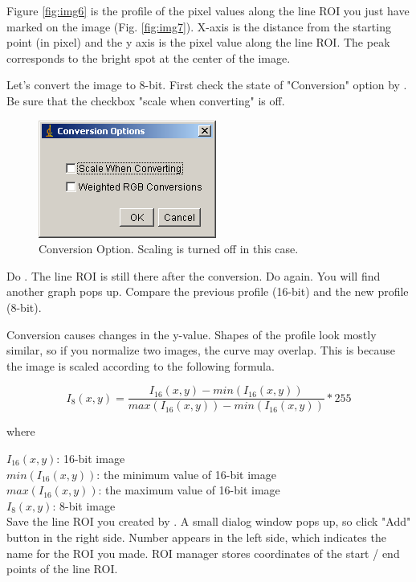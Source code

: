 \begin{indentexercise}{1}
Figure \ref{fig:img6} is the profile of the pixel values along the line ROI 
you just have marked on the image (Fig. \ref{fig:img7}). X-axis is the distance 
from the starting point (in pixel) and the y axis is the pixel value along the line ROI. 
The peak corresponds to the bright spot at the center of the image. 

Let's convert the image to 8-bit. First check the state
of "Conversion" option by
. Be
sure that the checkbox "scale when
converting" is off. 

\begin{figure}[htbp]
\begin{center}
\includegraphics[width=5.847cm,height=3.863cm]{img/CMCIBasicCourse201102-img8.png}
\caption{Conversion Option. Scaling is turned off in this case. }
\label{fig:img8}
\end{center}
\end{figure}


Do . The line
ROI is still there after the conversion. Do again. 
You will find another graph pops up. Compare the previous profile (16-bit) and the new profile (8-bit).

Conversion causes changes in the y-value. Shapes of the profile look
mostly similar, so if you normalize two images, the curve may overlap.
This is because the image is scaled according to the following
formula.

\[
I_{8}(x,y) = \frac{I_{16}(x, y) - min(I_{16}(x,y))}{ max(I_{16}(x,y)) -  min(I_{16}(x,y))} *255
\]

where

$I_{16}(x, y)$: 16-bit image\\
$min(I_{16}(x,y))$: the minimum value of 16-bit image\\
$max(I_{16}(x,y))$: the maximum value of 16-bit image\\
$I_{8}(x, y)$: 8-bit image\\


Save the line ROI you created by . A small dialog window pops up, so
click "Add" button in the right side.
Number appears in the left side, which indicates the name for the ROI
you made. ROI manager stores coordinates of the start / end points of
the line ROI.


\end{indentexercise}
